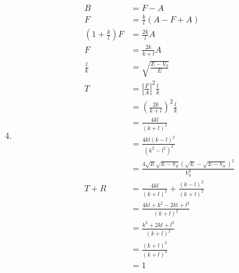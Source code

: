\documentclass{article}
\begin{document}
\begin{enumerate}
        \setcounter{enumi}{3}
  \item

        \begin{align*}
          B                                & = F - A                                                                 \\
          F                                & = \frac{k}{l} (A - F + A)                                               \\
          \left( 1 + \frac{k}{l} \right) F & = \frac{2 k}{l} A                                                       \\
          F                                & = \frac{2 k}{k + l} A                                                   \\
          \frac{l}{k}                      & = \sqrt{\frac{E - V_0}{E}}                                              \\
          T                                & = \left| \frac{F}{A} \right|^2 \frac{l}{k}                              \\
                                           & = \left( \frac{2 k}{k + l} \right)^2 \frac{l}{k}                        \\
                                           & = \frac{4 k l}{(k + l)^2}                                               \\
                                           & = \frac{4 k l (k - l)^2}{(k^2 - l^2)^2}                                 \\
                                           & = \frac{4 \sqrt{E} \sqrt{E - V_0} (\sqrt{E} - \sqrt{E - V_0})^2}{V_0^2} \\
          T + R                            & = \frac{4 k l}{(k + l)^2} + \frac{(k - l)^2}{(k + l)^2}                 \\
                                           & = \frac{4 k l + k^2 - 2 k l + l^2}{(k + l)^2}                           \\
                                           & = \frac{k^2 + 2 k l + l^2}{(k + l)^2}                                   \\
                                           & = \frac{(k + l)^2}{(k + l)^2}                                           \\
                                           & = 1
        \end{align*}
\end{enumerate}
\end{document}
